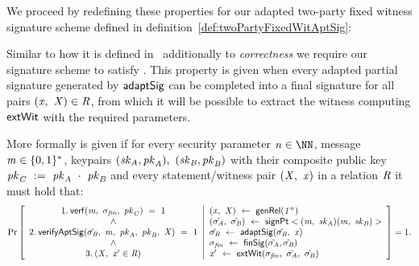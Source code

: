 We proceed by redefining these properties for our adapted two-party fixed witness signature scheme defined in definition~\ref{def:twoPartyFixedWitAptSig}:

\begin{definition}[\cnstAptSigCorrectness]\label{def:aptSigCorrectness}
Similar to how it is defined in~\cite{aumayr2020bitcoinchannels} additionally to \textit{correctness} we require our signature scheme to satisfy \cnstAptSigCorrectness.
This property is given when every adapted partial signature generated by $\mathsf{adaptSig}$ can be completed into a final signature for all pairs $(\mathit{x} ,~ \mathit{X}) \in \mathit{R}$, from which it will
be possible to extract the witness computing $\mathsf{extWit}$ with the required parameters.

More formally \cnstAptSigCorrectness is given if for every security parameter $\varN \in \cnstNatural$, message $\mathit{m} \in \{0,1\}^{*}$, keypairs $(\mathit{sk}_{\mathit{A}}, \mathit{pk}_{\mathit{A}}) ,~ (\mathit{sk}_{\mathit{B}}, \mathit{pk}_{\mathit{B}})$ 
with their composite public key $\mathit{pk}_{\mathit{C}} ~:=~ \mathit{pk}_{\mathit{A}} ~\cdot~ \mathit{pk}_{\mathit{B}}$ and every statement/witness pair $(\mathit{X} ,~ \mathit{x})$ in a relation $\mathit{R}$ it must hold that:
\[
    \Pr\left[
    \begin{array}{c}
        1.\:\mathsf{verf}(\mathit{m} ,~ \sigma_{\mathit{fin}} ,~ \mathit{pk}_{\mathit{C}}) ~=~ 1 \\
        ~\land~ \\
        2.\: \mathsf{verifyAptSig}(\hat{\sigma_{\mathit{B}}} ,~ \mathit{m} ,~ \mathit{pk}_{\mathit{A}} ,~ \mathit{pk}_{\mathit{B}} ,~ \mathit{X}) ~=~ 1 \\
        ~\land~ \\
        3.\:(\mathit{X} ,~ \mathit{x}' \in \mathit{R})
    \end{array}
    \middle\vert
    \begin{array}{l}
        (\mathit{x} ,~ \mathit{X}) ~\leftarrow~ \mathsf{genRel}(\mathit{1^n}) \\
        (\tilde{\sigma_{\mathit{A}}} ,~ \tilde{\sigma_{\mathit{B}}}) ~\leftarrow~ \mathsf{signPt}<(\mathit{m} ,~ \mathit{sk}_{\mathit{A}})(\mathit{m} ,~ \mathit{sk}_{\mathit{B}})> \\
        \hat{\sigma_{\mathit{B}}} ~\leftarrow~ \mathsf{adaptSig}(\tilde{\sigma_{\mathit{B}}} ,~ \mathit{x}) \\
        \sigma_{\mathit{fin}} ~\leftarrow~ \mathsf{finSig}(\tilde{\sigma_{\mathit{A}}},\tilde{\sigma_{\mathit{B}}}) \\
        \mathit{x}' ~\leftarrow~ \mathsf{extWit}(\sigma_{\mathit{fin}} ,~ \tilde{\sigma_{\mathit{A}}} ,~ \hat{\sigma_{\mathit{B}}})
    \end{array}
    \right]=1.
\]
\end{definition}

